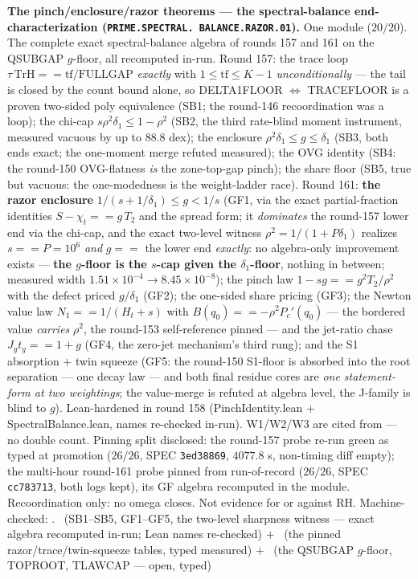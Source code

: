 \documentclass[11pt,a4paper]{article}
\theoremstyle{definition}
\begin{document}
\par\smallskip\noindent\textbf{The pinch/enclosure/razor
theorems --- the spectral-balance end-characterization
(\texttt{PRIME.\allowbreak SPECTRAL.\allowbreak
BALANCE.\allowbreak RAZOR.01}).}
One module ($20/20$).  The complete exact spectral-balance
algebra of rounds 157 and 161 on the QSUBGAP $g$-floor, all
recomputed in-run.  Round 157: the trace loop $\tau\,\mathrm{TrH}
== \mathrm{tf}/\mathrm{FULLGAP}$ \emph{exactly} with $1 \le
\mathrm{tf} \le K - 1$ \emph{unconditionally} --- the tail is
closed by the count bound alone, so DELTA1FLOOR
$\Leftrightarrow$ TRACEFLOOR is a proven two-sided poly
equivalence (SB1; the round-146 recoordination was a loop); the
chi-cap $s\rho^2\delta_1 \le 1 - \rho^2$ (SB2, the third
rate-blind moment instrument, measured vacuous by up to $88.8$
dex); the enclosure $\rho^2\delta_1 \le g \le \delta_1$ (SB3,
both ends exact; the one-moment merge refuted measured); the OVG
identity (SB4: the round-150 OVG-flatness \emph{is} the
zone-top-gap pinch); the share floor (SB5, true but vacuous: the
one-modedness is the weight-ladder race).  Round 161: \textbf{the
razor enclosure} $1/(s + 1/\delta_1) \le g < 1/s$ (GF1, via the
exact partial-fraction identities $S - \chi_t == g\,T_2$ and the
spread form; it \emph{dominates} the round-157 lower end via the
chi-cap, and the exact two-level witness $\rho^2 = 1/(1 +
P\delta_1)$ realizes $s == P = 10^6$ \emph{and} $g ==$ the lower
end \emph{exactly}: no algebra-only improvement exists ---
\textbf{the $g$-floor is the $s$-cap given the $\delta_1$-floor},
nothing in between; measured width $1.51\times10^{-4} \to
8.45\times10^{-8}$); the pinch law $1 - sg == g^2 T_2/\rho^2$
with the defect priced $g/\delta_1$ (GF2); the one-sided share
pricing (GF3); the Newton value law $N_1 == 1/(H_t + s)$ with
$B(q_0) == -\rho^2 P_c'(q_0)$ --- the bordered value
\emph{carries} $\rho^2$, the round-153 self-reference pinned ---
and the jet-ratio chase $J_g t_g == 1 + g$ (GF4, the zero-jet
mechanism's third rung); and the S1 absorption $+$ twin squeeze
(GF5: the round-150 S1-floor is absorbed into the root
separation --- one decay law --- and both final residue cores
are \emph{one statement-form at two weightings}; the value-merge
is refuted at algebra level, the J-family is blind to $g$).
Lean-hardened in round 158 (PinchIdentity.lean $+$
SpectralBalance.lean, names re-checked in-run).  W1/W2/W3 are
cited from  --- no
double count.  Pinning split disclosed: the round-157 probe
re-run green as typed at promotion ($26/26$, SPEC
\texttt{3ed38869}, $4077.8$ s, non-timing diff empty); the
multi-hour round-161 probe pinned from run-of-record ($26/26$,
SPEC \texttt{cc783713}, both logs kept), its GF algebra
recomputed in the module.  Recoordination only: no omega closes.
Not evidence for or against RH.
Machine-checked:
.
\mE\ (SB1--SB5, GF1--GF5, the two-level sharpness witness ---
exact algebra recomputed in-run; Lean names re-checked) $+$ \mC\
(the pinned razor/trace/twin-squeeze tables, typed measured) $+$
\mO\ (the QSUBGAP $g$-floor, TOPROOT, TLAWCAP --- open, typed)
\par\smallskip
\end{document}
